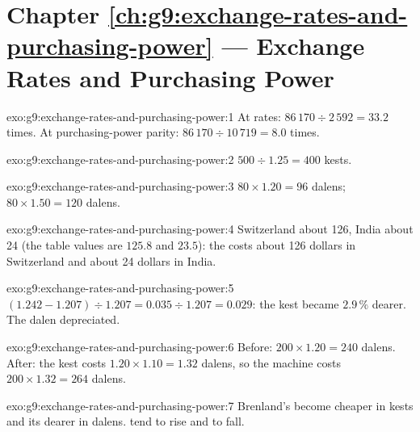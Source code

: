 \section*{Chapter \ref{ch:g9:exchange-rates-and-purchasing-power} --- Exchange Rates and Purchasing Power}

\begin{solution}{exo:g9:exchange-rates-and-purchasing-power:1}
At  rates: $86\,170 \div 2\,592 = 33.2$ times. At purchasing-power parity: $86\,170 \div 10\,719 = 8.0$
times.
\end{solution}

\begin{solution}{exo:g9:exchange-rates-and-purchasing-power:2}
$500 \div 1.25 = 400$ kests.
\end{solution}

\begin{solution}{exo:g9:exchange-rates-and-purchasing-power:3}
$80 \times 1.20 = 96$ dalens; $80 \times 1.50 = 120$ dalens.
\end{solution}

\begin{solution}{exo:g9:exchange-rates-and-purchasing-power:4}
Switzerland about 126, India about 24 (the table values are $125.8$ and $23.5$): the  costs about 126
dollars in Switzerland and about 24 dollars in India.
\end{solution}

\begin{solution}{exo:g9:exchange-rates-and-purchasing-power:5}
$(1.242 - 1.207) \div 1.207 = 0.035 \div 1.207 = 0.029$: the kest became $2.9\,\%$ dearer. The dalen
depreciated.
\end{solution}

\begin{solution}{exo:g9:exchange-rates-and-purchasing-power:6}
Before: $200 \times 1.20 = 240$ dalens. After: the kest costs $1.20 \times 1.10 = 1.32$ dalens, so the
machine costs $200 \times 1.32 = 264$ dalens.
\end{solution}

\begin{solution}{exo:g9:exchange-rates-and-purchasing-power:7}
Brenland's  become cheaper in kests and its  dearer in dalens.  tend to rise and
 to fall.
\end{solution}

